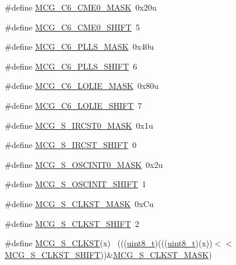 \begin{DoxyCompactItemize}
\item 
\#define \hyperlink{group___m_c_g___register___masks_ga2e0daa102ec3f225ed9297f7bc9f8239}{M\+C\+G\+\_\+\+C6\+\_\+\+C\+M\+E0\+\_\+\+M\+A\+SK}~0x20u
\item 
\#define \hyperlink{group___m_c_g___register___masks_ga096e62e71f69f5b749999d671d800090}{M\+C\+G\+\_\+\+C6\+\_\+\+C\+M\+E0\+\_\+\+S\+H\+I\+FT}~5
\item 
\#define \hyperlink{group___m_c_g___register___masks_ga66a1dfdde86a9c165d7bdec17c77578f}{M\+C\+G\+\_\+\+C6\+\_\+\+P\+L\+L\+S\+\_\+\+M\+A\+SK}~0x40u
\item 
\#define \hyperlink{group___m_c_g___register___masks_ga690a1869788f450cfa53d73f983a1c05}{M\+C\+G\+\_\+\+C6\+\_\+\+P\+L\+L\+S\+\_\+\+S\+H\+I\+FT}~6
\item 
\#define \hyperlink{group___m_c_g___register___masks_ga570e4d94e6cf7ddb93c1f2fc64aa1ddd}{M\+C\+G\+\_\+\+C6\+\_\+\+L\+O\+L\+I\+E\+\_\+\+M\+A\+SK}~0x80u
\item 
\#define \hyperlink{group___m_c_g___register___masks_ga13a0cab6f8d95b32cfb4648a3815b641}{M\+C\+G\+\_\+\+C6\+\_\+\+L\+O\+L\+I\+E\+\_\+\+S\+H\+I\+FT}~7
\item 
\#define \hyperlink{group___m_c_g___register___masks_gad6f7e58c7e79711422f08b90667f4056}{M\+C\+G\+\_\+\+S\+\_\+\+I\+R\+C\+S\+T0\+\_\+\+M\+A\+SK}~0x1u
\item 
\#define \hyperlink{group___m_c_g___register___masks_ga9abb1ad8f00a085572bb58ab815b7afd}{M\+C\+G\+\_\+\+S\+\_\+\+I\+R\+C\+S\+T\+\_\+\+S\+H\+I\+FT}~0
\item 
\#define \hyperlink{group___m_c_g___register___masks_ga75a97c37fbe3689889ea81fd04f13805}{M\+C\+G\+\_\+\+S\+\_\+\+O\+S\+C\+I\+N\+I\+T0\+\_\+\+M\+A\+SK}~0x2u
\item 
\#define \hyperlink{group___m_c_g___register___masks_gad4f77495f587ae7218d74ebc14939067}{M\+C\+G\+\_\+\+S\+\_\+\+O\+S\+C\+I\+N\+I\+T\+\_\+\+S\+H\+I\+FT}~1
\item 
\#define \hyperlink{group___m_c_g___register___masks_gaf43507c78cdda211a04b5ae0509edb2e}{M\+C\+G\+\_\+\+S\+\_\+\+C\+L\+K\+S\+T\+\_\+\+M\+A\+SK}~0x\+Cu
\item 
\#define \hyperlink{group___m_c_g___register___masks_gab0768a667adb2dc2e1fb7972f9fd85a4}{M\+C\+G\+\_\+\+S\+\_\+\+C\+L\+K\+S\+T\+\_\+\+S\+H\+I\+FT}~2
\item 
\#define \hyperlink{group___m_c_g___register___masks_gabb753abc57dbb658ff413c418d8b68c8}{M\+C\+G\+\_\+\+S\+\_\+\+C\+L\+K\+ST}(x)                                                  ~(((\hyperlink{_p_e___types_8h_aba7bc1797add20fe3efdf37ced1182c5}{uint8\+\_\+t})(((\hyperlink{_p_e___types_8h_aba7bc1797add20fe3efdf37ced1182c5}{uint8\+\_\+t})(x))$<$$<$\hyperlink{group___m_c_g___register___masks_gab0768a667adb2dc2e1fb7972f9fd85a4}{M\+C\+G\+\_\+\+S\+\_\+\+C\+L\+K\+S\+T\+\_\+\+S\+H\+I\+FT}))\&\hyperlink{group___m_c_g___register___masks_gaf43507c78cdda211a04b5ae0509edb2e}{M\+C\+G\+\_\+\+S\+\_\+\+C\+L\+K\+S\+T\+\_\+\+M\+A\+SK})
$$
\end{DoxyCompactItemize}
